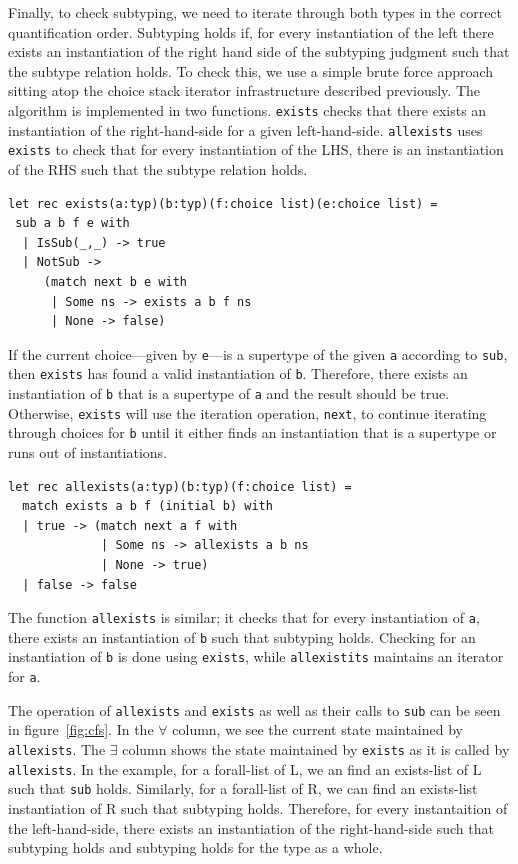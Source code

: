 \documentclass[a4paper,english]{lipics-v2019}
\begin{document}
Finally, to check subtyping, we need to iterate through both types in the 
correct quantification order. Subtyping holds if, for every instantiation 
of the left there exists an instantiation of the right hand side of the
subtyping judgment such that the subtype relation holds. To check this,
we use a simple brute force approach sitting atop the choice stack iterator
infrastructure described previously. The algorithm is implemented in two
functions. \verb|exists| checks that there exists an instantiation
of the right-hand-side for a given left-hand-side. \verb|allexists|
uses \verb|exists| to check that for every instantiation of the LHS,
there is an instantiation of the RHS such that the subtype relation
holds. 


\begin{lstlisting}
let rec exists(a:typ)(b:typ)(f:choice list)(e:choice list) =
 sub a b f e with 
  | IsSub(_,_) -> true 
  | NotSub -> 
     (match next b e with
      | Some ns -> exists a b f ns 
      | None -> false) 
\end{lstlisting}

If the current choice---given by \verb|e|---is a supertype of the given
\verb|a| according to \verb|sub|, then \verb|exists| has found
a valid instantiation of \verb|b|. Therefore, there exists an instantiation
of \verb|b| that is a supertype of \verb|a| and the result should be true.
Otherwise, \verb|exists| will use the iteration operation,
\verb|next|, to continue iterating through choices for \verb|b| until
it either finds an instantiation that is a supertype or runs out of
instantiations.

 \begin{lstlisting}
let rec allexists(a:typ)(b:typ)(f:choice list) =
  match exists a b f (initial b) with 
  | true -> (match next a f with
             | Some ns -> allexists a b ns 
             | None -> true) 
  | false -> false
\end{lstlisting}

The function \verb|allexists| is similar; it checks that for every
instantiation of \verb|a|, there exists an instantiation of 
\verb|b| such that subtyping holds. Checking for an instantiation
of \verb|b| is done using \verb|exists|, while \verb|allexistits|
maintains an iterator for \verb|a|.

The operation of \verb|allexists| and \verb|exists| as well as their
calls to \verb|sub| can be seen in figure~\ref{fig:cfs}. In the
$\forall$ column, we see the current state maintained by \verb|allexists|.
The $\exists$ column shows the state maintained by \verb|exists| as it is
called by \verb|allexists|. In the example, for a forall-list of L, we an
find an exists-list of L such that \verb|sub| holds. Similarly,
for a forall-list of R, we can find an exists-list instantiation of R such
that subtyping holds. Therefore, for every instantaition of the left-hand-side,
there exists an instantiation of the right-hand-side such that subtyping holds
and subtyping holds for the type as a whole.
\end{document}
